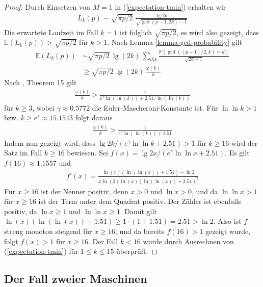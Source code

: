 \documentclass[a4paper, 10pt, ngerman]{article}
\newcommand{\E}{\mathbb{E}}
\renewcommand{\P}{\mathbb{P}}
\begin{document}
\begin{proof}
    Durch Einsetzen von $M = 1$ in (\ref{expectation-tmin}) erhalten wir
    \begin{align*}
        L_k(p) \sim \sqrt {\pi p / 2} \; \frac {\lg 2k} {\sqrt{\gcd(p - 1, 2k) - 1}}
    \end{align*}
    Die erwartete Laufzeit im Fall $k = 1$ ist folglich $\sqrt{\pi p/2}$, es wird also gezeigt, dass $\E(L_k(p)) > \sqrt{\pi p / 2}$ für $k > 1$. Nach Lemma \ref{lemma-gcd-probability} gilt
    \begin{align*}
        \E(L_k(p))
         & \sim \sqrt{\pi p / 2} \, \lg (2k) \, \sum_{d | k} \frac {\P(\gcd((p - 1)/2, k) = d)} { \sqrt {2d - 1}} \nonumber \\
         & \ge \sqrt{\pi p / 2} \, \lg (2k) \, \frac {\varphi(k)} k
    \end{align*}
    Nach \cite{rs62}, Theorem 15 gilt
    \begin{align*}
        \frac {\varphi(k)} k > \frac 1 {e^\gamma \ln (\ln (k)) + 2.51 / \ln (\ln (k))}
    \end{align*}
    für $k \ge 3$, wobei $\gamma \approx 0.5772$ die Euler-Mascheroni-Konstante ist. Für $\ln \ln k > 1$ bzw. $k \ge e^e \approx 15.1543$ folgt daraus
    \begin{align*}
        \frac {\varphi(k)} k > \frac 1 {e^\gamma \ln (\ln (k)) + 2.51}
    \end{align*}
    Indem nun gezeigt wird, dass $\lg 2k / (e^\gamma \ln \ln k + 2.51) > 1$ für $k \ge 16$ wird der Satz im Fall $k \ge 16$ bewiesen. Sei $f(x) = \lg 2x / (e^\gamma \ln \ln x + 2.51)$. Es gilt $f(16) \approx 1.1557$ und
    \begin{align*}
        f'(x) = \frac {\ln (x)(\ln (\ln (x)) + 1.51) - \ln 2} {x \ln (2) \ln (x)(\ln(\ln(x)) + 2.51)^2}
    \end{align*}
    Für $x \ge 16$ ist der Nenner positiv, denn $x > 0$ und $\ln x > 0$, und da $\ln \ln x > 1$ für $x \ge 16$ ist der Term unter dem Quadrat positiv. Der Zähler ist ebenfalls positiv, da $\ln x \ge 1$ und $\ln \ln x \ge 1$. Damit gilt $\ln(x)(\ln(\ln(x)) + 1.51) \ge 1 \cdot (1 + 1.51) = 2.51 > \ln 2$. Also ist $f$ streng monoton steigend für $x \ge 16$, und da bereits $f(16) > 1$ gezeigt wurde, folgt $f(x) > 1$ für $x \ge 16$. Der Fall $k < 16$ wurde durch Ausrechnen von (\ref{expectation-tmin}) für $1 \le k \le 15$ überprüft.
\end{proof}

\subsection{Der Fall zweier Maschinen}
\end{document}
